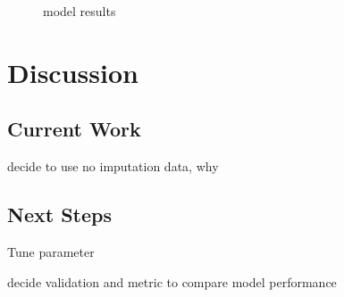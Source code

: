 \documentclass[
]{article}
\begin{document}
\begin{figure}[H]

{\centering {}\newline{}

}

\caption{model results}\label{fig:ml2}
\end{figure}

\section{Discussion}\label{discussion}

\subsection{Current Work}\label{current-work}

decide to use no imputation data, why

\subsection{Next Steps}\label{next-steps}

Tune parameter

decide validation and metric to compare model performance
\end{document}
